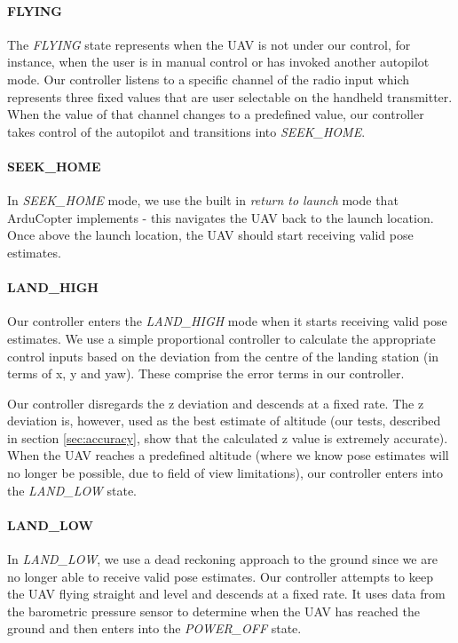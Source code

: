 \documentclass[10pt]{scrartcl} %
\begin{document}
\paragraph{FLYING}
The \textit{FLYING} state represents when the UAV is not under our control, for
instance, when the user is in manual control or has invoked another autopilot
mode. Our controller listens to a specific channel of the radio input which
represents three fixed values that are user selectable on the handheld
transmitter. When the value of that channel changes to a predefined value, our
controller takes control of the autopilot and transitions into
\textit{SEEK\_HOME}.

\paragraph{SEEK\_HOME}
In \textit{SEEK\_HOME} mode, we use the built in \textit{return to launch} mode
that ArduCopter implements - this navigates the UAV back to the launch
location. Once above the launch location, the UAV should start receiving valid
pose estimates.

\paragraph{LAND\_HIGH}
Our controller enters the \textit{LAND\_HIGH} mode when it starts receiving
valid pose estimates. We use a simple proportional controller to calculate the
appropriate control inputs based on the deviation from the centre of the
landing station (in terms of x, y and yaw). These comprise the error terms in
our controller.

Our controller disregards the z deviation and descends at a fixed rate. The z
deviation is, however, used as the best estimate of altitude (our tests,
described in section \ref{sec:accuracy}, show that the calculated z value is
extremely accurate). When the UAV reaches a predefined altitude (where we know
pose estimates will no longer be possible, due to field of view limitations),
our controller enters into the \textit{LAND\_LOW} state.

\paragraph{LAND\_LOW}
In \textit{LAND\_LOW}, we use a dead reckoning approach to the ground since we
are no longer able to receive valid pose estimates. Our controller attempts to
keep the UAV flying straight and level and descends at a fixed rate. It uses
data from the barometric pressure sensor to determine when the UAV has reached
the ground and then enters into the \textit{POWER\_OFF} state.
\end{document}
